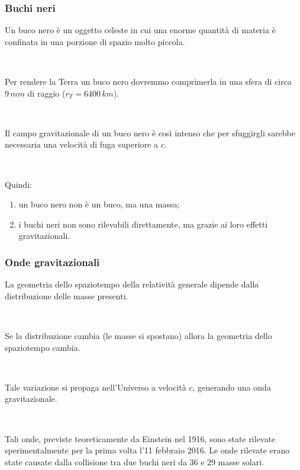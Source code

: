 \documentclass[]{beamer}
\theoremstyle{plain}
\begin{document}
\begin{frame}
\frametitle{Buchi neri}
Un buco nero è un oggetto celeste in cui una enorme quantità di materia è confinata in una porzione di spazio molto piccola.\pause

~

Per rendere la Terra un buco nero dovremmo comprimerla in una sfera di circa $ 9\, mm $ di raggio ($ r_T = 6400 \, km $).\pause

~

Il campo gravitazionale di un buco nero è così intenso che per sfuggirgli sarebbe necessaria una velocità di fuga superiore a $ c $.\pause

~

Quindi:
\begin{enumerate}
  \item un buco nero non è un buco, ma una massa;\pause
  \item i buchi neri non sono rilevabili direttamente, ma grazie ai loro effetti gravitazionali.
\end{enumerate}
\end{frame}

\begin{frame}
\frametitle{Onde gravitazionali}
La geometria dello spaziotempo della relatività generale dipende dalla distribuzione delle masse presenti.\pause

~

Se la distribuzione cambia (le masse si spostano) allora la geometria dello spaziotempo cambia.\pause

~

Tale variazione si propaga nell'Universo a velocità $ c $, generando una \alert{onda gravitazionale}.\pause

~

Tali onde, previste teoreticamente da Einstein nel 1916, sono state rilevate sperimentalmente per la prima volta l'11 febbraio 2016. Le onde rilevate erano state causate dalla collisione tra due buchi neri da 36 e 29 masse solari.
\begin{center}
\href{video/Ondegravitazionali.mp4}{}
\end{center}
\end{frame}
\end{document}
